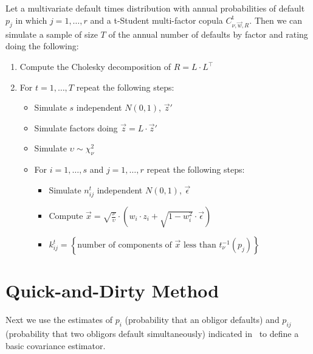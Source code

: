 \documentclass[11pt,fleqn]{book} %
\begin{document}
\begin{algorithm}
	\label{alg:snod}
	Let a multivariate default times distribution with annual probabilities of
	default $p_j$ in which $j=1,\dots,r$ and a t-Student multi-factor copula 
	$C_{\nu,\vec{w},R}^{\text{t}}$. Then we can simulate a sample of size $T$ of 
	the annual number of defaults by factor and rating doing the following:
	\begin{enumerate}
		\item Compute the Cholesky decomposition of $R = L \cdot L^\intercal$
		\item For $t=1,\dots,T$ repeat the following steps:
		\begin{itemize}
			\item Simulate $s$ independent $N(0,1)$, $\vec{z}'$
			\item Simulate factors doing $\vec{z} = L \cdot \vec{z}'$
			\item Simulate $\upsilon \sim \chi_{\nu}^2$
			\item For $i=1,\dots,s$ and $j=1,\dots,r$ repeat the following steps:
			\begin{itemize}
				\item Simulate $n_{ij}^t$ independent $N(0,1)$, $\vec{\epsilon}$
				\item Compute $\vec{x} = \sqrt{\frac{\nu}{\upsilon}} \cdot \left( w_i \cdot z_i + \sqrt{1-w_i^2} \cdot \vec{\epsilon} \right)$
				\item $k_{ij}^t = \left\{ \text{number of components of $\vec{x}$ less than $t_{\nu}^{-1}(p_j)$} \right\} $
			\end{itemize}
		\end{itemize}
	\end{enumerate}
\end{algorithm}

\section{Quick-and-Dirty Method}

Next we use the estimates of $p_i$ (probability that an obligor defaults)
and $p_{ij}$ (probability that two obligors default simultaneously) indicated 
in~\cite{nagpal:2001} to define a basic covariance estimator. 
\end{document}
